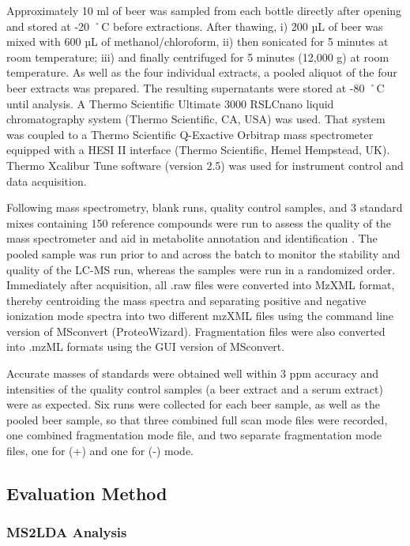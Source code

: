 Approximately 10 ml of beer was sampled from each bottle directly after opening and stored at -20 ˚C before extractions. After thawing, i) 200 µL of beer was mixed with 600 µL of methanol/chloroform, ii) then sonicated for 5 minutes at room temperature; iii) and finally centrifuged for 5 minutes (12,000 g) at room temperature. As well as the four individual extracts, a pooled aliquot of the four beer extracts was prepared. The resulting supernatants were stored at -80 ˚C until analysis. A Thermo Scientific Ultimate 3000 RSLCnano liquid chromatography system (Thermo Scientific, CA, USA) was used. That system was coupled to a Thermo Scientific Q-Exactive Orbitrap mass spectrometer equipped with a HESI II interface (Thermo Scientific, Hemel Hempstead, UK). Thermo Xcalibur Tune software (version 2.5) was used for instrument control and data acquisition.

Following mass spectrometry, blank runs, quality control samples, and 3 standard mixes containing 150 reference compounds were run to assess the quality of the mass spectrometer and aid in metabolite annotation and identification \cite{Creek2011}. The pooled sample was run prior to and across the batch to monitor the stability and quality of the LC-MS run, whereas the samples were run in a randomized order. Immediately after acquisition, all .raw files were converted into MzXML format, thereby centroiding the mass spectra and separating positive and negative ionization mode spectra into two different mzXML files using the command line version of MSconvert (ProteoWizard). Fragmentation files were also converted into .mzML formats using the GUI version of MSconvert.  

Accurate masses of standards were obtained well within 3 ppm accuracy and intensities of the quality control samples (a beer extract and a serum extract) were as expected. Six runs were collected for each beer sample, as well as the pooled beer sample, so that three combined full scan mode files were recorded, one combined fragmentation mode file, and two separate fragmentation mode files, one for (+) and one for (-) mode. 

\subsection{Evaluation Method}

\subsubsection{MS2LDA Analysis}

